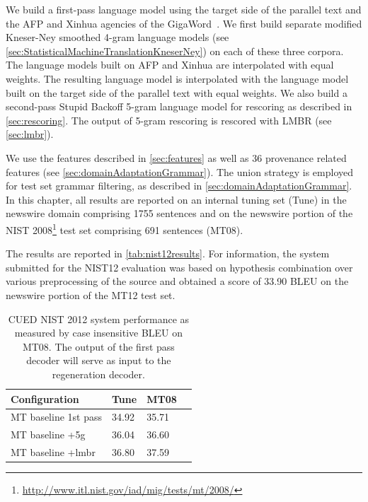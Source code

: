 We build a first-pass language model using the target side
of the parallel text and the AFP and Xinhua agencies of the
GigaWord~\citep{parker-graff-kong-chen-maeda:2009:LDC}. %
We first build separate modified Kneser-Ney smoothed 4-gram language
models (see \autoref{sec:StatisticalMachineTranslationKneserNey})
on each of these three corpora. The language models built on AFP
and Xinhua are interpolated with equal weights. The
resulting language model is interpolated with the
language model built on the target side of the parallel
text with equal weights. We also build a second-pass %
Stupid Backoff 5-gram language model for rescoring
as described in \autoref{sec:rescoring}.
The output of 5-gram rescoring is rescored with LMBR (see \autoref{sec:lmbr}).

We use the features described in \autoref{sec:features}
as well as 36 provenance related features (see \autoref{sec:domainAdaptationGrammar}).
The union
strategy is employed for test set grammar filtering, as described
in \autoref{sec:domainAdaptationGrammar}.
In this chapter, all results are reported on an internal tuning set (Tune)
in the newswire domain comprising
1755 sentences and on the newswire portion of the NIST
2008\footnote{\url{http://www.itl.nist.gov/iad/mig/tests/mt/2008/}} test
set comprising 691 sentences (MT08).

The results are reported in \autoref{tab:nist12results}.
For information, the system submitted for the NIST12 evaluation was based
on hypothesis combination over various preprocessing of the source and obtained
a score of 33.90 BLEU on the newswire portion of the MT12 test set.
%
\begin{table}
  \begin{center}
    \begin{tabular}{l|lll}
      Configuration   & Tune & MT08 \\
      \hline
      MT baseline 1st pass & 34.92 & 35.71 \\
      MT baseline +5g      & 36.04 & 36.60 \\
      MT baseline +lmbr    & 36.80 & 37.59 \\
    \end{tabular}
    \caption{CUED NIST 2012 system performance as measured by case insensitive BLEU on MT08. The output of the
      first pass decoder will serve as input to the regeneration decoder.}
    \label{tab:nist12results}
  \end{center}
\end{table}

